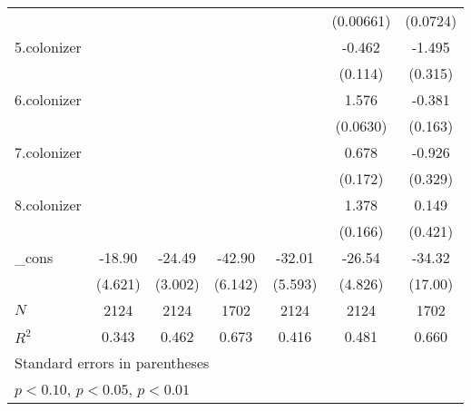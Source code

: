 {\begin{tabular}{l*{6}{c}}
            &                     &                     &                     &                     &   (0.00661)         &    (0.0724)         \\
[1em]
5.colonizer &                     &                     &                     &                     &      -0.462\sym{***}&      -1.495\sym{***}\\
            &                     &                     &                     &                     &     (0.114)         &     (0.315)         \\
[1em]
6.colonizer &                     &                     &                     &                     &       1.576\sym{***}&      -0.381\sym{*}  \\
            &                     &                     &                     &                     &    (0.0630)         &     (0.163)         \\
[1em]
7.colonizer &                     &                     &                     &                     &       0.678\sym{***}&      -0.926\sym{**} \\
            &                     &                     &                     &                     &     (0.172)         &     (0.329)         \\
[1em]
8.colonizer &                     &                     &                     &                     &       1.378\sym{***}&       0.149         \\
            &                     &                     &                     &                     &     (0.166)         &     (0.421)         \\
[1em]
\_cons      &      -18.90\sym{***}&      -24.49\sym{***}&      -42.90\sym{***}&      -32.01\sym{***}&      -26.54\sym{***}&      -34.32\sym{*}  \\
            &     (4.621)         &     (3.002)         &     (6.142)         &     (5.593)         &     (4.826)         &     (17.00)         \\
\hline
\(N\)       &        2124         &        2124         &        1702         &        2124         &        2124         &        1702         \\
\(R^{2}\)   &       0.343         &       0.462         &       0.673         &       0.416         &       0.481         &       0.660         \\
\hline\hline
\multicolumn{7}{l}{\footnotesize Standard errors in parentheses}\\
\multicolumn{7}{l}{\footnotesize \sym{*} \(p<0.10\), \sym{**} \(p<0.05\), \sym{***} \(p<0.01\)}\\
\end{tabular}
}
